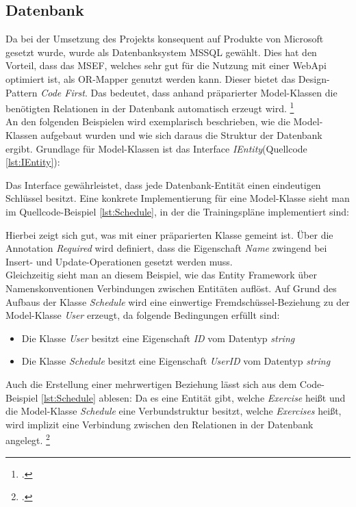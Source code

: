 \subsection{Datenbank}
\label{ssec:aufbau-server-db}
Da bei der Umsetzung des Projekts konsequent auf Produkte von Microsoft gesetzt wurde, wurde als Datenbanksystem \ac{MSSQL} gewählt. Dies hat den Vorteil, dass das \gls{MSEF}, welches sehr gut für die Nutzung mit einer WebApi optimiert ist, als \gls{OR-Mapper} genutzt werden kann. Dieser bietet das Design-Pattern \textit{Code First}. Das bedeutet, dass anhand präparierter Model-Klassen die benötigten Relationen in der Datenbank automatisch erzeugt wird. \footcite{entity-framework-code-first}\\
An den folgenden Beispielen wird exemplarisch beschrieben, wie die Model-Klassen aufgebaut wurden und wie sich daraus die Struktur der Datenbank ergibt. Grundlage für Model-Klassen ist das Interface \textit{IEntity}(Quellcode \ref{lst:IEntity}):

Das Interface gewährleistet, dass jede Datenbank-Entität einen eindeutigen Schlüssel besitzt.
Eine konkrete Implementierung für eine Model-Klasse sieht man im Quellcode-Beispiel \ref{lst:Schedule}, in der die Trainingspläne implementiert sind:

Hierbei zeigt sich gut, was mit einer präparierten Klasse gemeint ist. Über die Annotation \textit{Required} wird definiert, dass die Eigenschaft \textit{Name} zwingend bei Insert- und Update-Operationen gesetzt werden muss. \\
Gleichzeitig sieht man an diesem Beispiel, wie das Entity Framework über Namenskonventionen Verbindungen zwischen Entitäten auflöst. Auf Grund des Aufbaus der Klasse \textit{Schedule} wird eine \ac{einwertige Fremdschüssel}-Beziehung zu der Model-Klasse \textit{User} erzeugt, da folgende Bedingungen erfüllt sind:
\begin{itemize}
\item Die Klasse \textit{User} besitzt eine Eigenschaft \textit{ID} vom Datentyp \textit{string}
\item Die Klasse \textit{Schedule} besitzt eine Eigenschaft \textit{UserID} vom Datentyp \textit{string}
\end{itemize}
Auch die Erstellung einer \ac{mehrwertigen} Beziehung lässt sich aus dem Code-Beispiel \ref{lst:Schedule} ablesen: Da es eine Entität gibt, welche \textit{Exercise} heißt und die Model-Klasse \textit{Schedule} eine Verbundstruktur besitzt, welche \textit{Exercises} heißt, wird implizit eine Verbindung zwischen den Relationen in der Datenbank angelegt. \footcite{entity-framework-code-first}
